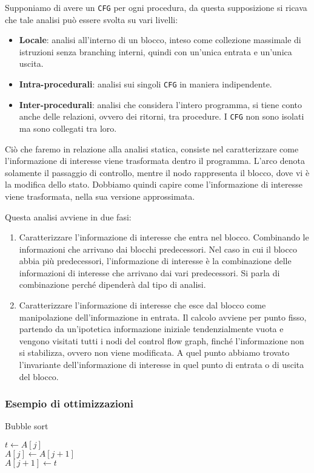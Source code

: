 Supponiamo di avere un \texttt{CFG} per ogni procedura, da questa supposizione si ricava che tale analisi può
essere svolta su vari livelli:
\begin{itemize}
    \item \textbf{Locale}: analisi all'interno di un blocco, inteso come collezione massimale di istruzioni senza 
    branching interni, quindi con un'unica entrata e un'unica uscita. 
    \item \textbf{Intra-procedurali}: analisi sui singoli \texttt{CFG} in maniera indipendente.
    \item \textbf{Inter-procedurali}: analisi che considera l'intero programma, si tiene conto anche 
    delle relazioni, ovvero dei ritorni, tra procedure. I \texttt{CFG} non sono 
    isolati ma sono collegati tra loro.
\end{itemize}

Ciò che faremo in relazione alla analisi statica, consiste nel caratterizzare come l'informazione di interesse
viene trasformata dentro il programma. L'arco denota solamente il passaggio di controllo, mentre il nodo 
rappresenta il blocco, dove vi è la modifica dello stato.
Dobbiamo quindi capire come l'informazione di interesse viene trasformata, nella sua versione approssimata.

Questa analisi avviene in due fasi:
\begin{enumerate}
    \item Caratterizzare l'informazione di interesse che entra nel blocco. Combinando le informazioni 
    che arrivano dai blocchi predecessori. Nel caso in cui il blocco abbia più predecessori, l'informazione
    di interesse è la combinazione delle informazioni di interesse che arrivano dai vari predecessori.
    Si parla di combinazione perché dipenderà dal tipo di analisi.
    \item Caratterizzare l'informazione di interesse che esce dal blocco come manipolazione dell'informazione
    in entrata. Il calcolo avviene per punto fisso, partendo da un'ipotetica informazione iniziale tendenzialmente 
    vuota e vengono visitati tutti i nodi del control flow graph, finché l'informazione non si stabilizza, ovvero 
    non viene modificata. A quel punto abbiamo trovato l'invariante dell'informazione di interesse in quel punto di entrata 
    o di uscita del blocco.
\end{enumerate}

\subsubsection{Esempio di ottimizzazioni}
\begin{algorithm}[H]
    \caption{Bubble sort}
    {
        {
            {
                $t \gets A[j]$\\
                $A[j] \gets A[j + 1]$\\
                $A[j + 1] \gets t$\\
            }
        }
    }
\end{algorithm}

